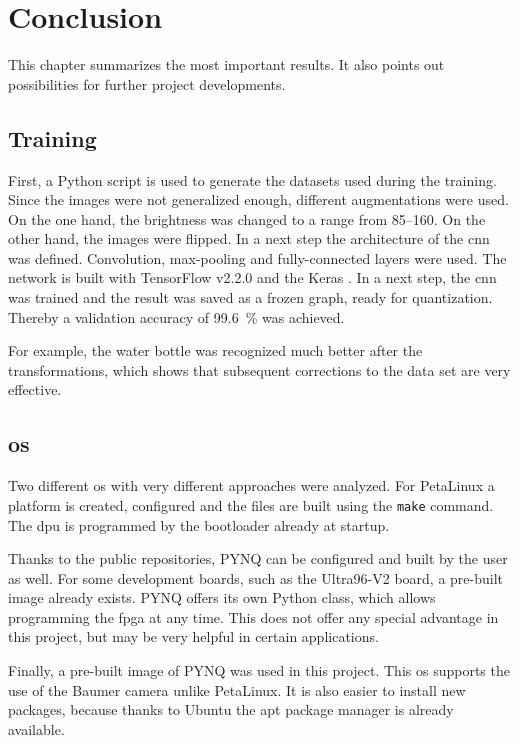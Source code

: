 \chapter{Conclusion}
\label{ch:conclusion}

This chapter summarizes the most important results.
It also points out possibilities for further project developments.

\section{Training}
\label{sec:conclusion:training}

First, a Python script is used to generate the datasets used during the training.
Since the images were not generalized enough, different augmentations were used.
On the one hand, the brightness was changed to a range from \numrange{85}{160}.
On the other hand, the images were flipped.
In a next step the architecture of the \acrshort{cnn} was defined.
Convolution, max-pooling and fully-connected layers were used.
The network is built with TensorFlow v2.2.0 and the Keras .
In a next step, the \acrshort{cnn} was trained and the result was saved as a frozen graph, ready for quantization.
Thereby a validation accuracy of \SI{99.6}{\percent} was achieved.

For example, the water bottle was recognized much better after the transformations, which shows that subsequent corrections to the data set are very effective.

\section{\Acrlong{os}}
\label{sec:conclusion:os}
Two different \acrshort{os} with very different approaches were analyzed.
For PetaLinux a platform is created, configured and the files are built using the \texttt{make} command.
The \acrshort{dpu} is programmed by the bootloader already at startup.

Thanks to the public repositories, PYNQ can be configured and built by the user as well.
For some development boards, such as the Ultra96-V2 board, a pre-built image already exists.
PYNQ offers its own Python class, which allows programming the \acrshort{fpga} at any time.
This does not offer any special advantage in this project, but may be very helpful in certain applications.

Finally, a pre-built image of PYNQ was used in this project.
This \acrlong{os} supports the use of the Baumer camera unlike PetaLinux.
It is also easier to install new packages, because thanks to Ubuntu the \acrshort{apt} package manager is already available.

